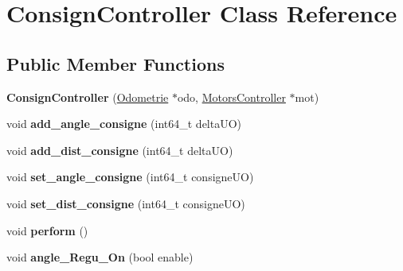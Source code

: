 \hypertarget{classConsignController}{}\section{Consign\+Controller Class Reference}
\label{classConsignController}
\subsection*{Public Member Functions}
\begin{DoxyCompactItemize}
\item 
\mbox{\label{classConsignController_a448be996f1511c1c9e913d556885bf6e}} 
{\bfseries Consign\+Controller} (\hyperlink{classOdometrie}{Odometrie} $\ast$odo, \hyperlink{classMotorsController}{Motors\+Controller} $\ast$mot)
\item 
\mbox{\label{classConsignController_a2ae2bf0b890baf128e6eb4fd68fd5de0}} 
void {\bfseries add\+\_\+angle\+\_\+consigne} (int64\+\_\+t delta\+UO)
\item 
\mbox{\label{classConsignController_a6ee4db6ddd63e787cf1f3cc638345406}} 
void {\bfseries add\+\_\+dist\+\_\+consigne} (int64\+\_\+t delta\+UO)
\item 
\mbox{\label{classConsignController_a99a2c15e6ceb2d229f8357ee90185cc2}} 
void {\bfseries set\+\_\+angle\+\_\+consigne} (int64\+\_\+t consigne\+UO)
\item 
\mbox{\label{classConsignController_ac468058115f53b94202a13d4a8b8a39e}} 
void {\bfseries set\+\_\+dist\+\_\+consigne} (int64\+\_\+t consigne\+UO)
\item 
\mbox{\label{classConsignController_a90deafd1c5e1948cafec786219b844fb}} 
void {\bfseries perform} ()
\item 
\mbox{\label{classConsignController_ad6059481f0503eb82ba18bd635f08e6d}} 
void {\bfseries angle\+\_\+\+Regu\+\_\+\+On} (bool enable)
\item 
\mbox{\label{classConsignController_a80d256dd7cb4b9c4fb9740b4f05ac5fa}} 

\end{DoxyCompactItemize}
